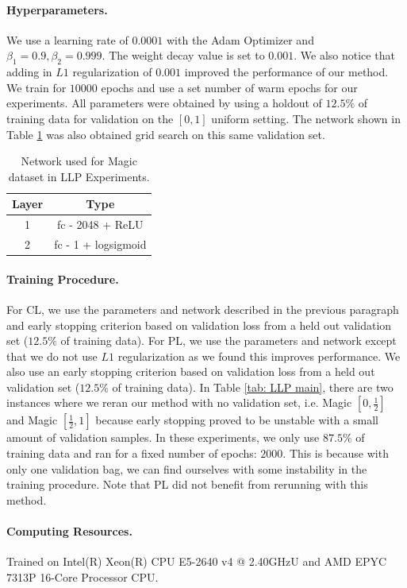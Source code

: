 \documentclass{article}
\begin{document}
\paragraph{Hyperparameters.}
We use a learning rate of $0.0001$ with the Adam Optimizer and $\beta_1 = 0.9, \beta_2 = 0.999$. The weight decay value is set to $0.001$. We also notice that adding in $L1$ regularization of $0.001$ improved the performance of our method. We train for $10000$ epochs and use a set number of warm epochs for our experiments. All parameters were obtained by using a holdout of $12.5\%$ of training data for validation on the $[0, 1]$ uniform setting. The network shown in Table \ref{tab:Magic Net} was also obtained grid search on this same validation set.
\begin{table}[h]
    \centering
    \caption{Network used for Magic dataset in LLP Experiments.}
    \begin{tabular}{c|c}
        \toprule
         Layer & Type\\
         \midrule
         1 & fc - 2048 + ReLU\\
         2 & fc - 1 + logsigmoid\\
        \bottomrule
    \end{tabular}
    \label{tab:Magic Net}
\end{table}
\paragraph{Training Procedure.} For CL, we use the parameters and network described in the previous paragraph and early stopping criterion based on validation loss from a held out validation set ($12.5\%$ of training data). For PL, we use the parameters and network except that we do not use $L1$ regularization as we found this improves performance. We also use an early stopping criterion based on validation loss from a held out validation set ($12.5\%$ of training data). In Table \ref{tab: LLP main}, there are two instances where we reran our method with no validation set, i.e. Magic $[0, \frac{1}{2}]$ and Magic $[\frac{1}{2}, 1]$ because early stopping proved to be unstable with a small amount of validation samples. In these experiments, we only use $87.5\%$ of training data and ran for a fixed number of epochs: $2000$. This is because with only one validation bag, we can find ourselves with some instability in the training procedure. Note that PL did not benefit from rerunning with this method. 

\paragraph{Computing Resources.} Trained on Intel(R) Xeon(R) CPU E5-2640 v4 @ 2.40GHzU and AMD EPYC 7313P 16-Core Processor CPU.
\end{document}
